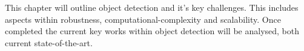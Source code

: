 This chapter will outline object detection and it's key challenges. This includes aspects within robustness, computational-complexity and scalability. Once completed the current key works within object detection will be analysed, both current state-of-the-art. 


